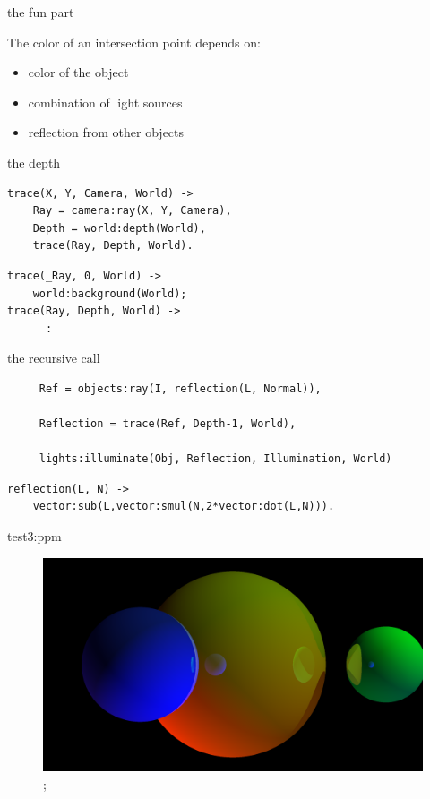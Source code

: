 \begin{frame}{the fun part}

The color of an intersection point depends on:

\begin{itemize}
 \pause \item color of the object
 \pause \item combination of light sources 
 \pause \item reflection from other objects
\end{itemize}

\end{frame}

\begin{frame}[fragile]{the depth}

\begin{verbatim}
trace(X, Y, Camera, World) ->
    Ray = camera:ray(X, Y, Camera),
    Depth = world:depth(World),
    trace(Ray, Depth, World).
\end{verbatim}

\pause 
\begin{verbatim}
trace(_Ray, 0, World) ->
    world:background(World);
trace(Ray, Depth, World) ->
      :
\end{verbatim}

\end{frame}


\begin{frame}[fragile]{the recursive call}

\pause 
\begin{verbatim}
     Ref = objects:ray(I, reflection(L, Normal)),

     Reflection = trace(Ref, Depth-1, World),

     lights:illuminate(Obj, Reflection, Illumination, World)
\end{verbatim}

\pause
\begin{verbatim}
reflection(L, N) ->
    vector:sub(L,vector:smul(N,2*vector:dot(L,N))).
\end{verbatim}

\end{frame}

\begin{frame}{test3:ppm}

\begin{figure}
\includegraphics[scale=0.2]{test3.png};
\end{figure}

\end{frame}


